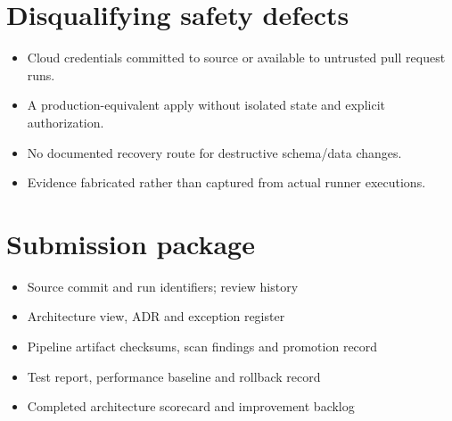 \documentclass[10pt,letterpaper]{article}
\begin{document}
\section{Disqualifying safety defects}
\begin{itemize}
\item Cloud credentials committed to source or available to untrusted pull request runs.
\item A production-equivalent apply without isolated state and explicit authorization.
\item No documented recovery route for destructive schema/data changes.
\item Evidence fabricated rather than captured from actual runner executions.
\end{itemize}

\section{Submission package}
\begin{itemize}
\item Source commit and run identifiers; review history
\item Architecture view, ADR and exception register
\item Pipeline artifact checksums, scan findings and promotion record
\item Test report, performance baseline and rollback record
\item Completed architecture scorecard and improvement backlog
\end{itemize}
\end{document}
